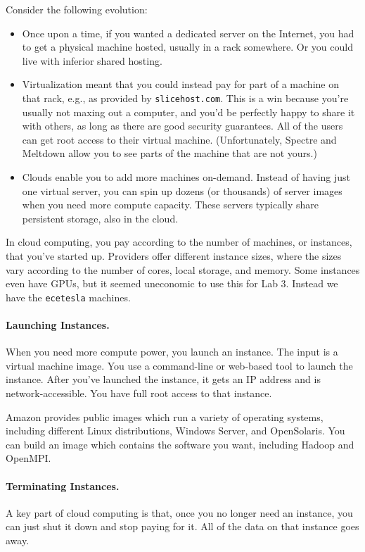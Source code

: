 Consider the following evolution:
\begin{itemize}
\item Once upon a time, if you wanted a dedicated server on the
  Internet, you had to get a physical machine hosted, usually in a
  rack somewhere. Or you could live with inferior shared hosting.
\item Virtualization meant that you could instead pay for part of a
  machine on that rack, e.g., as provided by {\tt slicehost.com}. This
  is a win because you're usually not maxing out a computer, and you'd
  be perfectly happy to share it with others, as long as there are
  good security guarantees. All of the users can get root access to their virtual machine.
  (Unfortunately, Spectre and Meltdown allow you to see parts of the machine that are not yours.)
\item Clouds enable you to add more machines on-demand. Instead of
  having just one virtual server, you can spin up dozens (or
  thousands) of server images when you need more compute
  capacity. These servers typically share persistent storage, also in
  the cloud. 
\end{itemize}

In cloud computing, you pay according to the number of machines, or
instances, that you've started up. Providers offer different instance
sizes, where the sizes vary according to the number of cores, local
storage, and memory. Some instances even have GPUs, but it seemed 
uneconomic to use this for Lab 3.
Instead we have the {\tt ecetesla} machines.

\paragraph{Launching Instances.} When you need more compute power,
you launch an instance. The input is a virtual machine image. You use
a command-line or web-based tool to launch the instance. After you've
launched the instance, it gets an IP address and is
network-accessible. You have full root access to that instance.

Amazon provides public images which run a variety of operating
systems, including different Linux distributions, Windows Server, and
OpenSolaris. You can build an image which contains the software you
want, including Hadoop and OpenMPI.

\paragraph{Terminating Instances.} A key part of cloud computing is
that, once you no longer need an instance, you can just shut it down
and stop paying for it. All of the data on that instance goes away.

